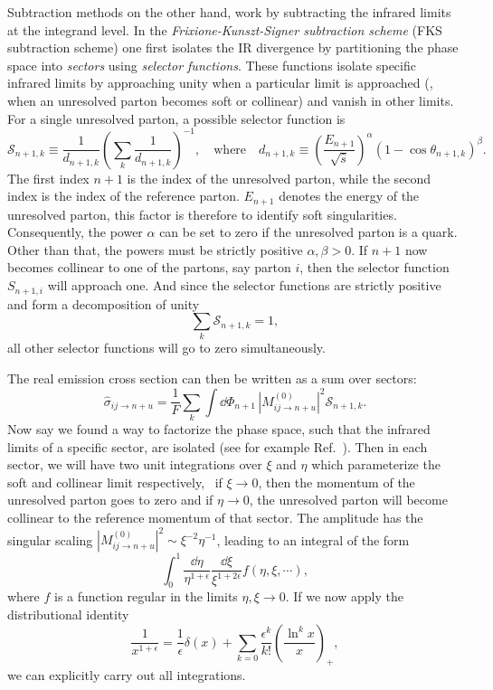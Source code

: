 Subtraction methods on the other hand, work by subtracting the infrared limits at the integrand level. In the \textit{Frixione-Kunszt-Signer subtraction scheme} (FKS subtraction scheme) one first isolates the \acs{IR} divergence by partitioning the phase space into \textit{sectors} using \textit{selector functions}. These functions isolate specific infrared limits by approaching unity when a particular limit is approached (\eg, when an unresolved parton becomes soft or collinear) and vanish in other limits. For a single unresolved parton, a possible selector function is
\begin{equation}
\mathcal{S}_{n+1,k} \equiv \frac{1}{d_{n+1,k}} \left(\sum_{k} \frac{1}{d_{n+1,k}} \right)^{-1}, \quad \text{where} \quad d_{n+1,k} \equiv \left(\frac{E_{n+1}}{\sqrt{\hat{s}}}\right)^\alpha (1 - \cos \theta_{n+1,k})^\beta.
\end{equation}
The first index $n+1$ is the index of the unresolved parton, while the second index is the index of the reference parton. $E_{n+1}$ denotes the energy of the unresolved parton, this factor is therefore to identify soft singularities. Consequently, the power $\alpha$ can be set to zero if the unresolved parton is a quark. Other than that, the powers must be strictly positive $\alpha, \beta > 0$. If $n+1$ now becomes collinear to one of the partons, say parton $i$, then the selector function $S_{n+1,i}$ will approach one. And since the selector functions are strictly positive and form a decomposition of unity
\begin{equation}
\sum_k \mathcal{S}_{n+1,k} = 1,
\end{equation}
all other selector functions will go to zero simultaneously.

The real emission cross section can then be written as a sum over sectors:
\begin{equation}
\hat{\sigma}_{ij \rightarrow n+u} = \frac{1}{F} \sum_k \int \dd \Phi_{n + 1} \, |M_{ij \rightarrow n + u}^{(0)}|^2 \mathcal{S}_{n+1, k}.
\end{equation}
Now say we found a way to factorize the phase space, such that the infrared limits of a specific sector, are isolated (see for example Ref.~\cite{Czakon:2019tmo}). Then in each sector, we will have two unit integrations over $\xi$ and $\eta$ which parameterize the soft and collinear limit respectively, \ie\ if $\xi\rightarrow 0$, then the momentum of the unresolved parton goes to zero and if $\eta \rightarrow 0$, the unresolved parton will become collinear to the reference momentum of that sector. The amplitude has the singular scaling $|M_{ij \rightarrow n + u}^{(0)}|^2 \sim \xi^{-2} \eta^{-1}$, leading to an integral of the form
\begin{equation}
\int_0^1 \frac{\dd \eta}{\eta^{1 + \epsilon}} \frac{\dd \xi}{\xi^{1 + 2 \epsilon}} f(\eta, \xi, \cdots),
\end{equation}
where $f$ is a function regular in the limits $\eta, \xi \rightarrow 0$. If we now apply the distributional identity
\begin{equation}
\frac{1}{x^{1 + \epsilon}} = \frac{1}{\epsilon} \delta (x) + \sum_{k = 0} \frac{\epsilon^k}{k!} \left( \frac{\ln^k x}{x} \right)_+,
\end{equation}
we can explicitly carry out all integrations.

